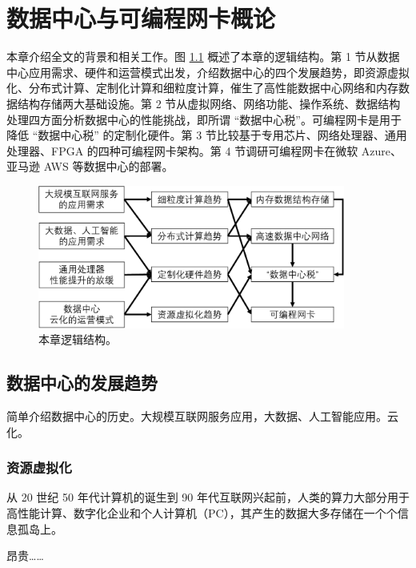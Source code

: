 \chapter{数据中心与可编程网卡概论}
\label{chapter:background}

本章介绍全文的背景和相关工作。图 \ref{background:fig:overview} 概述了本章的逻辑结构。第 1 节从数据中心应用需求、硬件和运营模式出发，介绍数据中心的四个发展趋势，即资源虚拟化、分布式计算、定制化计算和细粒度计算，催生了高性能数据中心网络和内存数据结构存储两大基础设施。第 2 节从虚拟网络、网络功能、操作系统、数据结构处理四方面分析数据中心的性能挑战，即所谓 ``数据中心税''。可编程网卡是用于降低 ``数据中心税'' 的定制化硬件。第 3 节比较基于专用芯片、网络处理器、通用处理器、FPGA 的四种可编程网卡架构。第 4 节调研可编程网卡在微软 Azure、亚马逊 AWS 等数据中心的部署。


\begin{figure}[htbp]
	\centering
	\includegraphics[width=0.9\textwidth]{figures/background_overview.pdf}
	\caption{本章逻辑结构。}
	\label{background:fig:overview}
\end{figure}

\section{数据中心的发展趋势}
\label{background:sec:trend}

简单介绍数据中心的历史。大规模互联网服务应用，大数据、人工智能应用。云化。

\subsection{资源虚拟化}
\label{background:sec:datacenter-virtualization}


从 20 世纪 50 年代计算机的诞生到 90 年代互联网兴起前，人类的算力大部分用于高性能计算、数字化企业和个人计算机（PC），其产生的数据大多存储在一个个信息孤岛上。

昂贵……

